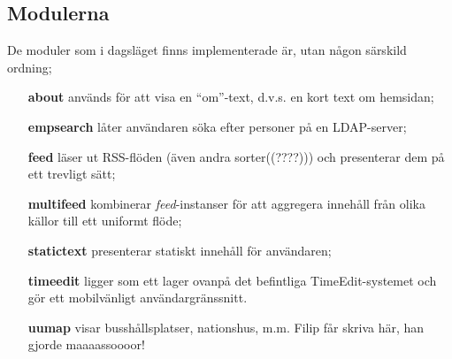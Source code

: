 \subsection{Modulerna}
De moduler som i dagsläget finns implementerade är, utan någon särskild
ordning;

\begin{itemize}
\item[\bf{about}] används för att visa en ``om''-text, d.v.s. en kort text om
hemsidan;

\item[\bf{empsearch}] låter användaren söka efter personer på en LDAP-server;

\item[\bf{feed}] läser ut RSS-flöden (även andra sorter((????))) och
presenterar dem på ett trevligt sätt;

\item[\bf{multifeed}] kombinerar \emph{feed}-instanser för att aggregera
innehåll från olika källor till ett uniformt flöde;

\item[\bf{statictext}] presenterar statiskt innehåll för användaren;

\item[\bf{timeedit}] ligger som ett lager ovanpå det befintliga
TimeEdit-systemet och gör ett mobilvänligt användargränssnitt.

\item[\bf{uumap}] visar busshållsplatser, nationshus, m.m. Filip får skriva
här, han gjorde maaaassoooor!

\end{itemize}



%
%
%
%
%
%
%

